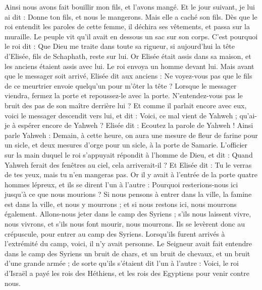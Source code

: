 \begin{multicols}{2}
Ainsi nous avons fait bouillir mon fils, et l’avons mangé. Et le jour suivant, je lui ai dit : Donne ton fils, et nous le mangerons. Mais elle a caché son fils.
Dès que le roi entendit les paroles de cette femme, il déchira ses vêtements, et passa sur la muraille. Le peuple vit qu’il avait en dessous un sac sur son corps.
C’est pourquoi le roi dit : Que Dieu me traite dans toute sa rigueur, si aujourd’hui la tête d’Elisée, fils de Schaphath, reste sur lui.
Or Elisée était assis dans sa maison, et les anciens étaient assis avec lui. Le roi envoya un homme devant lui. Mais avant que le messager soit arrivé, Elisée dit aux anciens : Ne voyez-vous pas que le fils de ce meurtrier envoie quelqu’un pour m’ôter la tête ? Lorsque le messager viendra, fermez la porte et repoussez-le avec la porte. N’entendez-vous pas le bruit des pas de son maître derrière lui ?
Et comme il parlait encore avec eux, voici le messager descendit vers lui, et dit : Voici, ce mal vient de Yahweh ; qu’ai-je à espérer encore de Yahweh ?
\VerseOne{}Elisée dit : Ecoutez la parole de Yahweh ! Ainsi parle Yahweh : Demain, à cette heure, on aura une mesure de fleur de farine pour un sicle, et deux mesures d’orge pour un sicle, à la porte de Samarie.
L’officier sur la main duquel le roi s’appuyait répondit à l’homme de Dieu, et dit : Quand Yahweh ferait des fenêtres au ciel, cela arriverait-il ? Et Elisée dit : Tu le verras de tes yeux, mais tu n’en mangeras pas.
Or il y avait à l’entrée de la porte quatre hommes lépreux, et ils se dirent l’un à l’autre : Pourquoi resterions-nous ici jusqu’à ce que nous mourions ?
Si nous pensons à entrer dans la ville, la famine est dans la ville, et nous y mourrons ; et si nous restons ici, nous mourrons également. Allons-nous jeter dans le camp des Syriens ; s’ils nous laissent vivre, nous vivrons, et s’ils nous font mourir, nous mourrons.
Ils se levèrent donc au crépuscule, pour entrer au camp des Syriens. Lorsqu’ils furent arrivés à l’extrémité du camp, voici, il n’y avait personne.
Le Seigneur avait fait entendre dans le camp des Syriens un bruit de chars, et un bruit de chevaux, et un bruit d’une grande armée ; de sorte qu’ils s’étaient dit l’un à l’autre : Voici, le roi d’Israël a payé les rois des Héthiens, et les rois des Egyptiens pour venir contre nous.

\end{multicols}
